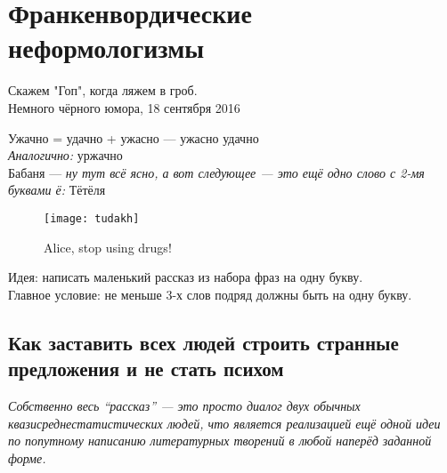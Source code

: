 \section{Франкенвордические неформологизмы}
\begin{epigraph}
        Скажем "Гоп", когда ляжем в гроб.\\
        Немного чёрного юмора, 18 сентября 2016 %
\end{epigraph}
Ужачно = удачно + ужасно --- ужасно удачно\\

\emph{Аналогично:} уржачно\\

Бабаня --- \emph{ну тут всё ясно, а вот следующее --- это ещё одно слово с 2-мя буквами ё:} Тётёля

\begin{figure}[ht!]
    \centering
    \texttt{[image: tudakh]}
    \caption{Alice, stop using drugs!}
\end{figure}

Идея: написать маленький рассказ из набора фраз на одну букву.\\
Главное условие: не меньше 3-х слов подряд должны быть на одну букву.

\subsection{Как заставить всех людей строить странные предложения и не стать психом}
\emph{Собственно весь ``рассказ'' --- это просто диалог двух обычных квазисреднестатистических людей, что является реализацией ещё одной идеи по попутному написанию литературных творений в любой наперёд заданной форме.}

